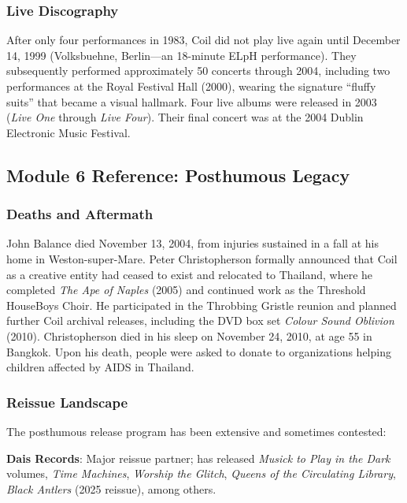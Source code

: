 \documentclass[11pt,letterpaper]{article}
\begin{document}
\subsubsection{Live Discography}

After only four performances in 1983, Coil did not play live again until December 14, 1999 (Volksbuehne, Berlin---an 18-minute ELpH performance). They subsequently performed approximately 50 concerts through 2004, including two performances at the Royal Festival Hall (2000), wearing the signature ``fluffy suits'' that became a visual hallmark. Four live albums were released in 2003 (\textit{Live One} through \textit{Live Four}). Their final concert was at the 2004 Dublin Electronic Music Festival.

\subsection{Module 6 Reference: Posthumous Legacy}

\subsubsection{Deaths and Aftermath}

John Balance died November 13, 2004, from injuries sustained in a fall at his home in Weston-super-Mare. Peter Christopherson formally announced that Coil as a creative entity had ceased to exist and relocated to Thailand, where he completed \textit{The Ape of Naples} (2005) and continued work as the Threshold HouseBoys Choir. He participated in the Throbbing Gristle reunion and planned further Coil archival releases, including the DVD box set \textit{Colour Sound Oblivion} (2010). Christopherson died in his sleep on November 24, 2010, at age 55 in Bangkok. Upon his death, people were asked to donate to organizations helping children affected by AIDS in Thailand.

\subsubsection{Reissue Landscape}

The posthumous release program has been extensive and sometimes contested:

\textbf{Dais Records}: Major reissue partner; has released \textit{Musick to Play in the Dark} volumes, \textit{Time Machines}, \textit{Worship the Glitch}, \textit{Queens of the Circulating Library}, \textit{Black Antlers} (2025 reissue), among others.
\end{document}
